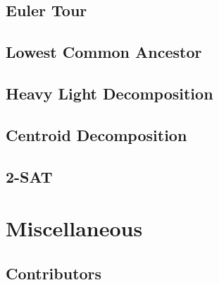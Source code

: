 \documentclass{article}
\begin{document}
\subsection{Euler Tour}
\subsection{Lowest Common Ancestor}
\subsection{Heavy Light Decomposition}
\subsection{Centroid Decomposition}
\subsection{2-SAT}
 


\section{Miscellaneous}

\subsection{Contributors}



\printbibliography[heading=bibintoc]
	
\end{document}
